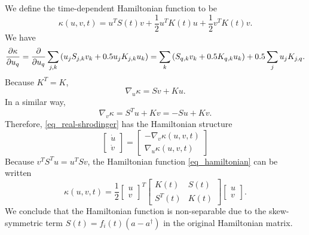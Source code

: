 \documentclass[11pt]{article}
\begin{document}
We define the time-dependent Hamiltonian function to be
\begin{equation}\label{eq_hamiltonian}
\kappa(u,v,t) = u^T S(t) v + \frac{1}{2} u^T K(t) u + \frac{1}{2} v^T K(t) v.
\end{equation}
We have
\[
\frac{\p\kappa}{\p u_q} =
%
\frac{\p}{\p u_q} \sum_{j,k} \left( u_j S_{j,k} v_k + 0.5 u_j K_{j,k} u_k \right) =
%
\sum_{k} \left( S_{q,k} v_k + 0.5 K_{q,k} u_k \right) + 0.5 \sum_{j} u_j K_{j,q}.
\]
Because $K^T = K$,
\[
\nabla_u \kappa = S v + K u.
\]
In a similar way,
\[
\nabla_v \kappa = S^T u + K v = -S u + Kv.
\]
Therefore, \eqref{eq_real-shrodinger} has the Hamiltonian structure
\begin{equation}\label{eq_hamiltonian-form}
  \begin{bmatrix}
    \dot{u} \\   \dot{v}
  \end{bmatrix} =
  \begin{bmatrix}
    -\nabla_v \kappa(u,v,t)\\
    \nabla_u \kappa(u,v,t)
  \end{bmatrix}
\end{equation}
Because $v^TS^Tu = u^TSv$, the Hamiltonian function \eqref{eq_hamiltonian} can be written
\[
\kappa(u,v,t) = \frac{1}{2} \begin{bmatrix} u \\ v \end{bmatrix}^T
%
\begin{bmatrix}
  K(t) & S(t) \\ S^T(t) & K(t)
\end{bmatrix}
\begin{bmatrix} u \\ v \end{bmatrix}.
\]
We conclude that the Hamiltonian function is non-separable due to the skew-symmetric term
$S(t) =f_i(t) ( a- a^\dag)$ in the original Hamiltonian matrix.
\end{document}
